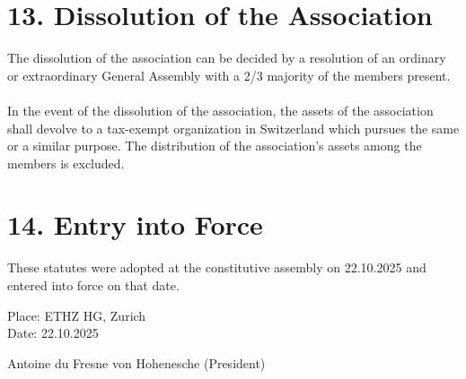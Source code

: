 \documentclass[11pt,a4paper]{article}
\begin{document}
\section*{13. Dissolution of the Association}

The dissolution of the association can be decided by a resolution of an ordinary or extraordinary General Assembly with a 2/3 majority of the members present.
\\\\
In the event of the dissolution of the association, the assets of the association shall devolve to a tax-exempt organization in Switzerland which pursues the same or a similar purpose. The distribution of the association's assets among the members is excluded.

\section*{14. Entry into Force}

These statutes were adopted at the constitutive assembly on 22.10.2025 and entered into force on that date.

\vspace{2cm}

\begin{flushright}
    Place: ETHZ HG, Zurich \\
    Date: 22.10.2025

    \vspace{1cm}

    Antoine du Fresne von Hohenesche (President)

\end{flushright}
\end{document}
